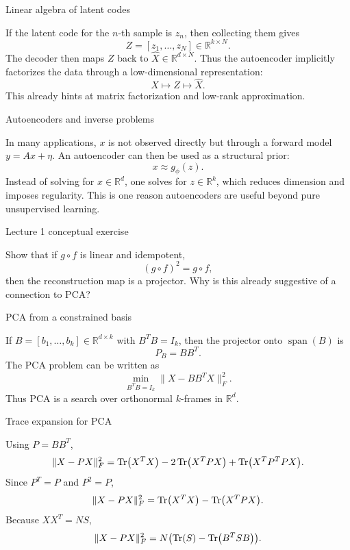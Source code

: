 \documentclass[aspectratio=169]{beamer}
\begin{document}
\begin{frame}{Linear algebra of latent codes}

If the latent code for the \(n\)-th sample is \(z_n\), then collecting them gives
\[
Z=[z_1,\dots,z_N]\in \mathbb{R}^{k\times N}.
\]
The decoder then maps \(Z\) back to \(\hat X\in \mathbb{R}^{d\times N}\).
Thus the autoencoder implicitly factorizes the data through a low-dimensional representation:
\[
X \mapsto Z \mapsto \hat X.
\]
This already hints at matrix factorization and low-rank approximation.

\end{frame}

\begin{frame}{Autoencoders and inverse problems}

In many applications, \(x\) is not observed directly but through a forward model \(y=Ax+\eta\).
An autoencoder can then be used as a structural prior:
\[
x \approx g_\phi(z).
\]
Instead of solving for \(x\in\mathbb{R}^d\), one solves for \(z\in\mathbb{R}^k\), which reduces dimension and imposes regularity.
This is one reason autoencoders are useful beyond pure unsupervised learning.

\end{frame}

\begin{frame}{Lecture 1 conceptual exercise}

Show that if \(g\circ f\) is linear and idempotent,
\[
(g\circ f)^2 = g\circ f,
\]
then the reconstruction map is a projector.
Why is this already suggestive of a connection to PCA?

\end{frame}

\begin{frame}{PCA from a constrained basis}

If \(B=[b_1,\dots,b_k]\in\mathbb{R}^{d\times k}\) with \(B^TB=I_k\), then the projector onto \(\operatorname{span}(B)\) is
\[
P_B = BB^T.
\]
The PCA problem can be written as
\[
\min_{B^TB=I_k}\|X-BB^TX\|_F^2.
\]
Thus PCA is a search over orthonormal \(k\)-frames in \(\mathbb{R}^d\).

\end{frame}

\begin{frame}{Trace expansion for PCA}

Using \(P=BB^T\),
\[
\|X-PX\|_F^2
=
\Tr(X^TX)-2\Tr(X^TPX)+\Tr(X^TP^TPX).
\]
Since \(P^T=P\) and \(P^2=P\),
\[
\|X-PX\|_F^2=\Tr(X^TX)-\Tr(X^TPX).
\]
Because \(XX^T=NS\),
\[
\|X-PX\|_F^2 = N\bigl(\Tr(S)-\Tr(B^TSB)\bigr).
\]

\end{frame}
\end{document}

